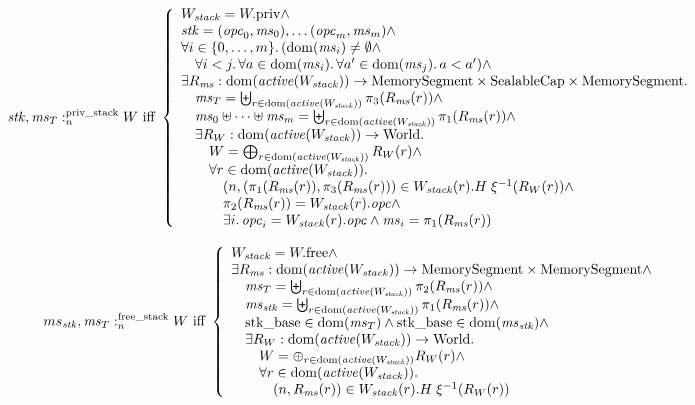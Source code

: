 \documentclass[a4paper]{article}
\begin{document}
\[
  \memSatStack{\stk,\ms_T}{W} \text{ iff } 
  \left\{
    \begin{array}{l}
      W_\var{stack} = \pwpriv \wedge \\
      \stk = (\opc_0,\ms_0), \dots (\opc_m,\ms_m) \wedge \\
      \forall i \in \{0,\dots,m\} \ldotp (\dom(\ms_i) \neq \emptyset \wedge\\
      \quad \forall i < j \ldotp \forall a \in \dom(\ms_i) \ldotp \forall a' \in \dom(\ms_j) \ldotp a < a') \wedge\\
      \exists R_\ms : \dom(\activeReg{W_\var{stack}}) \fun \MemSeg \times \SealableCaps \times \MemSeg \ldotp \\
      \quad \ms_T = \biguplus_{r \in \dom(\activeReg{W_\var{stack}})} \pi_3(R_\ms(r)) \wedge \\
      \quad \ms_0 \uplus \dots \uplus \ms_m = \biguplus_{r \in \dom(\activeReg{W_\var{stack}})} \pi_1(R_\ms(r)) \wedge \\
      \quad \exists R_W : \dom(\activeReg{W_\var{stack}}) \fun \World \ldotp \\
      \qquad W = \bigoplus_{r \in \dom(\activeReg{W_\var{stack}})} R_W(r) \wedge \\
      \qquad \forall r \in \dom(\activeReg{W_\var{stack}})\ldotp \\
      \qquad \quad \npair{(\pi_1(R_\ms(r)),\pi_3(R_\ms(r))} \in W_\var{stack}(r).H \; \xi^{-1}(R_W(r)) \wedge\\
      \qquad \quad \pi_2(R_\ms(r)) = W_\var{stack}(r).\opc \wedge\\
      \qquad \quad \exists i \ldotp \opc_i = W_\var{stack}(r).\opc \wedge \ms_i = \pi_1 (R_\ms(r))
    \end{array}
  \right.
\]

\[
  \memSatFStack{ms_\stk,\ms_T}{W} \text{ iff } 
  \left\{
    \begin{array}{l}
      W_\var{stack} = \pwfree \wedge \\
      \exists R_\ms : \dom(\activeReg{W_\var{stack}}) \fun \MemSeg \times \MemSeg \wedge \\
      \quad \ms_T = \biguplus_{r \in \dom(\activeReg{W_\var{stack}})} \pi_2(R_\ms(r)) \wedge \\
      \quad \ms_\stk = \biguplus_{r \in \dom(\activeReg{W_\var{stack}})} \pi_1(R_\ms(r)) \wedge \\
      \quad \stkb \in \dom(\ms_T) \wedge \stkb \in \dom(\ms_\stk) \wedge \\
      \quad \exists R_W : \dom(\activeReg{W_\var{stack}}) \fun \World\ldotp\\
      \qquad W = \oplus_{r \in \dom(\activeReg{W_\var{stack}})} R_W(r) \wedge\\
      \qquad \forall r \in \dom(\activeReg{W_\var{stack}}) \ldotp \\
      \qquad \quad \npair{R_\ms(r)} \in  W_\var{stack}(r).H \; \xi^{-1}(R_W(r))
    \end{array}
  \right.
\]
\end{document}
